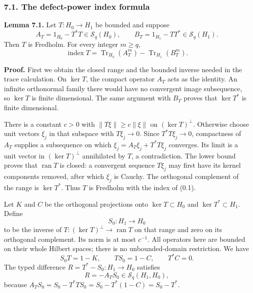 \documentclass[
  11pt,
]{article}
\begin{document}
\subsubsection{7.1. The defect-power index
formula}\label{the-defect-power-index-formula}

\textbf{Lemma 7.1.} Let \(T:H_0\to H_1\) be bounded and suppose \[
 A_T=1_{H_0}-T^*T\in\mathcal S_q(H_0),\qquad
 B_T=1_{H_1}-TT^*\in\mathcal S_q(H_1).
 \tag{7.3}
\] Then \(T\) is Fredholm. For every integer \(m\geq q\), \[
 \operatorname{index}T
   =\operatorname{Tr}_{H_0}(A_T^m)
      -\operatorname{Tr}_{H_1}(B_T^m).
 \tag{7.4}
\]

\textbf{Proof.} First we obtain the closed range and the bounded inverse
needed in the trace calculation. On \(\ker T\), the compact operator
\(A_T\) acts as the identity. An infinite orthonormal family there would
have no convergent image subsequence, so \(\ker T\) is finite
dimensional. The same argument with \(B_T\) proves that \(\ker T^*\) is
finite dimensional.

There is a constant \(c>0\) with \(\|T\xi\|\geq c\|\xi\|\) on
\((\ker T)^\perp\). Otherwise choose unit vectors \(\xi_j\) in that
subspace with \(T\xi_j\to0\). Since \(T^*T\xi_j\to0\), compactness of
\(A_T\) supplies a subsequence on which \(\xi_j=A_T\xi_j+T^*T\xi_j\)
converges. Its limit is a unit vector in \((\ker T)^\perp\) annihilated
by \(T\), a contradiction. The lower bound proves that
\(\operatorname{ran}T\) is closed: a convergent sequence \(T\xi_j\) may
first have its kernel components removed, after which \(\xi_j\) is
Cauchy. The orthogonal complement of the range is \(\ker T^*\). Thus
\(T\) is Fredholm with the index of (0.1).

Let \(K\) and \(C\) be the orthogonal projections onto
\(\ker T\subset H_0\) and \(\ker T^*\subset H_1\). Define \[
 S_0:H_1\longrightarrow H_0
\] to be the inverse of \(T:(\ker T)^\perp\to\operatorname{ran}T\) on
that range and zero on its orthogonal complement. Its norm is at most
\(c^{-1}\). All operators here are bounded on their whole Hilbert
spaces; there is no unbounded-domain restriction. We have \[
 S_0T=1-K,\qquad TS_0=1-C,\qquad T^*C=0.
 \tag{7.5}
\] The typed difference \(R=T^*-S_0:H_1\to H_0\) satisfies \[
 R=-A_TS_0\in\mathcal S_q(H_1,H_0),
 \tag{7.6}
\] because \(A_TS_0=S_0-T^*TS_0=S_0-T^*(1-C)=S_0-T^*\).
\end{document}
